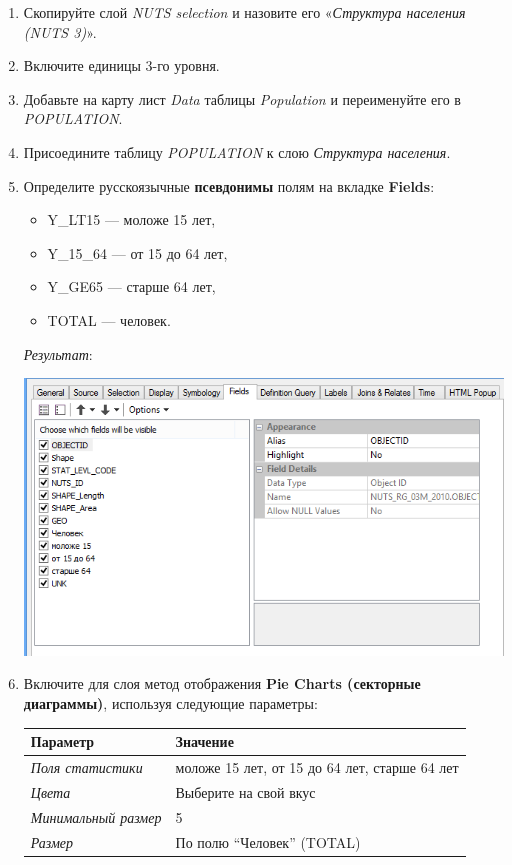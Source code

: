 \documentclass[]{book}
\providecommand{\tightlist}{%
  \setlength{\itemsep}{0pt}\setlength{\parskip}{0pt}}
\theoremstyle{definition}
\theoremstyle{definition}
\theoremstyle{definition}
\theoremstyle{remark}
\begin{document}
\begin{enumerate}
\def\labelenumi{\arabic{enumi}.}
\item
  Скопируйте слой \emph{NUTS selection} и назовите его «\emph{Структура
  населения (NUTS 3)}».
\item
  Включите единицы 3-го уровня.
\item
  Добавьте на карту лист \emph{Data} таблицы \emph{Population} и
  переименуйте его в \emph{POPULATION}.
\item
  Присоедините таблицу \emph{POPULATION} к слою \emph{Структура
  населения}.
\item
  Определите русскоязычные \textbf{псевдонимы} полям на вкладке
  \textbf{Fields}:

  \begin{itemize}
  \tightlist
  \item
    Y\_LT15 --- моложе 15 лет,
  \item
    Y\_15\_64 --- от 15 до 64 лет,
  \item
    Y\_GE65 --- старше 64 лет,
  \item
    TOTAL --- человек.
  \end{itemize}

  \emph{Результат}:

  \includegraphics{images/Ex08/image28.png}
\item
  Включите для слоя метод отображения \textbf{Pie Charts (секторные
  диаграммы)}, используя следующие параметры:

  \begin{longtable}[]{@{}ll@{}}
  \toprule
  Параметр & Значение\tabularnewline
  \midrule
  \endhead
  \emph{Поля статистики} & моложе 15 лет, от 15 до 64 лет, старше 64
  лет\tabularnewline
  \emph{Цвета} & Выберите на свой вкус\tabularnewline
  \emph{Минимальный размер} & 5\tabularnewline
  \emph{Размер} & По полю ``Человек'' (TOTAL)\tabularnewline
  \bottomrule
  \end{longtable}


\end{enumerate}
\end{document}
